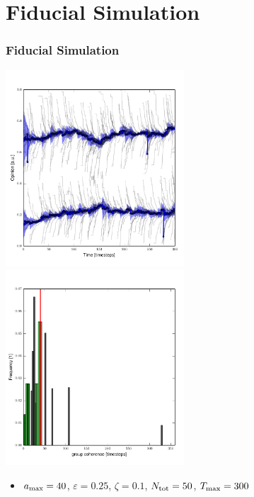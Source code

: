 \documentclass[10pt]{beamer}
\begin{document}
\section{Fiducial Simulation}
\begin{frame}\frametitle{Fiducial Simulation}
    \begin{center}
        \includegraphics[width=0.5\textwidth]{src/fiducial.pdf}
        \includegraphics[width=0.5\textwidth]{src/fiducial_var_th.pdf}
    \end{center}
    \begin{itemize}
        \item $a_{\rm max}=40$, $\varepsilon=0.25$, $\zeta=0.1$,
        $N_{\rm tot}=50$, $T_{\rm max}=300$
    \end{itemize}

\end{frame}
\end{document}
